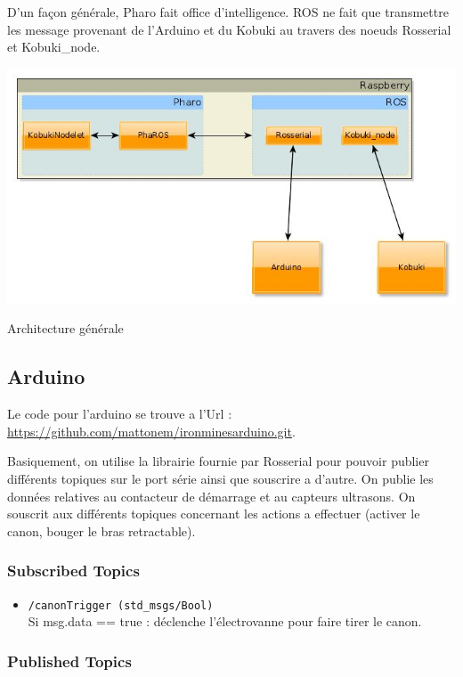 \documentclass[a4paper, 11pt]{article}
\begin{document}
D'un façon générale, Pharo fait office d'intelligence. ROS ne fait que
transmettre les message provenant de l'Arduino et du Kobuki au travers
des noeuds Rosserial et Kobuki\_node.
\begin{center}
  \includegraphics[width=\linewidth]{./architecture.jpg}
  \caption{Architecture générale}
  \label{archi_generale}
\end{center}
\subsection{Arduino}
Le code pour l'arduino se trouve a l'Url
:\\ \url{https://github.com/mattonem/ironminesarduino.git}.

Basiquement, on utilise la librairie fournie par Rosserial pour
pouvoir publier différents topiques sur le port série ainsi que souscrire
a d'autre. On publie les données relatives au contacteur de démarrage
et au capteurs ultrasons. On souscrit aux différents topiques concernant
les actions a effectuer (activer le canon, bouger le bras
retractable).

\subsubsection{Subscribed Topics}

\begin{itemize}
\item \texttt{/canonTrigger (std\_msgs/Bool)}\\ 
  Si msg.data == true :
  déclenche l'électrovanne pour faire tirer le canon.
\end{itemize}

\subsubsection{Published Topics}
\end{document}
